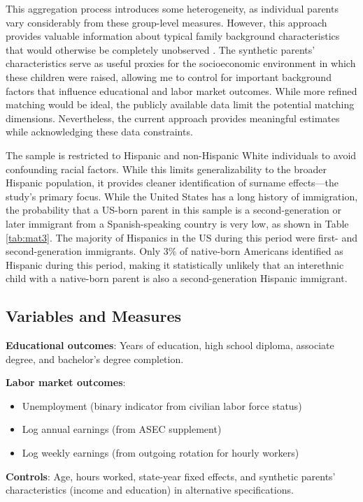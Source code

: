 This aggregation process introduces some heterogeneity, as individual parents vary considerably from these group-level measures. However, this approach provides valuable information about typical family background characteristics that would otherwise be completely unobserved \autocite{rubinstein2014pride,aaronson2008intergenerational}. The synthetic parents' characteristics serve as useful proxies for the socioeconomic environment in which these children were raised, allowing me to control for important background factors that influence educational and labor market outcomes. While more refined matching would be ideal, the publicly available data limit the potential matching dimensions. Nevertheless, the current approach provides meaningful estimates while acknowledging these data constraints.

The sample is restricted to Hispanic and non-Hispanic White individuals to avoid confounding racial factors. While this limits generalizability to the broader Hispanic population, it provides cleaner identification of surname effects—the study's primary focus. While the United States has a long history of immigration, the probability that a US-born parent in this sample is a second-generation or later immigrant from a Spanish-speaking country is very low, as shown in Table \ref{tab:mat3}. The majority of Hispanics in the US during this period were first- and second-generation immigrants. Only 3\% of native-born Americans identified as Hispanic during this period, making it statistically unlikely that an interethnic child with a native-born parent is also a second-generation Hispanic immigrant.

\subsection{Variables and Measures}

\textbf{Educational outcomes}: Years of education, high school diploma, associate degree, and bachelor's degree completion.

\textbf{Labor market outcomes}:
\begin{itemize}
\item Unemployment (binary indicator from civilian labor force status)
\item Log annual earnings (from ASEC supplement)
\item Log weekly earnings (from outgoing rotation for hourly workers)
\end{itemize}
\textbf{Controls}: Age, hours worked, state-year fixed effects, and synthetic parents' characteristics (income and education) in alternative specifications.

